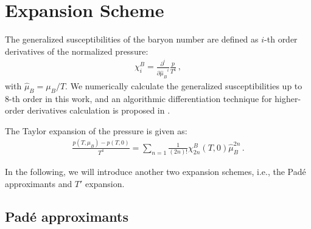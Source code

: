 \documentclass[%
reprint,
superscriptaddress,
preprintnumbers,
amsmath,amssymb,
aps,
prd,
]{revtex4-2}
\begin{document}
\section{Expansion Scheme}
\label{sec:Expansion_Scheme}

The generalized susceptibilities of the baryon number are defined as $i$-th order derivatives of the normalized pressure:
\begin{align}
\chi_i^B=\frac{\partial^i}{{\partial \hat \mu_B }^i}\frac{p}{T^4}\,,
\end{align}
with $\hat \mu_B=\mu_B/T$. We numerically calculate the generalized susceptibilities up to 8-th order in this work, and an algorithmic differentiation technique for higher-order derivatives calculation is proposed in \cite{Wagner:2009pm}.

The Taylor expansion of the pressure is given as:
\begin{align}
\frac{p(T,\hat \mu_B)-p(T,0)}{T^4}=\sum_{n=1}\frac{1}{(2n)!}\chi^B_{2n}(T,0)  \hat \mu_B^{2n}\,.
\label{eq:Taylor}
\end{align}

In the following, we will introduce another two expansion schemes, i.e., the Pad\'e approximants and $T'$ expansion.

\subsection{Pad\'e approximants}
\end{document}
